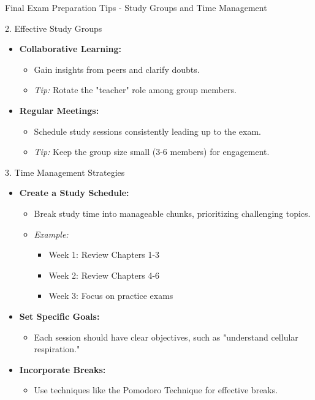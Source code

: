 \documentclass[aspectratio=169]{beamer}
\begin{document}
\begin{frame}[fragile]{Final Exam Preparation Tips - Study Groups and Time Management}
    \begin{block}{2. Effective Study Groups}
        \begin{itemize}
            \item \textbf{Collaborative Learning:}
            \begin{itemize}
                \item Gain insights from peers and clarify doubts.
                \item \textit{Tip:} Rotate the "teacher" role among group members.
            \end{itemize}
            \item \textbf{Regular Meetings:}
            \begin{itemize}
                \item Schedule study sessions consistently leading up to the exam.
                \item \textit{Tip:} Keep the group size small (3-6 members) for engagement.
            \end{itemize}
        \end{itemize}
    \end{block}

    \begin{block}{3. Time Management Strategies}
        \begin{itemize}
            \item \textbf{Create a Study Schedule:}
            \begin{itemize}
                \item Break study time into manageable chunks, prioritizing challenging topics.
                \item \textit{Example:} 
                \begin{itemize}
                    \item Week 1: Review Chapters 1-3
                    \item Week 2: Review Chapters 4-6
                    \item Week 3: Focus on practice exams
                \end{itemize}
            \end{itemize}
            \item \textbf{Set Specific Goals:}
            \begin{itemize}
                \item Each session should have clear objectives, such as "understand cellular respiration."
            \end{itemize}
            \item \textbf{Incorporate Breaks:}
            \begin{itemize}
                \item Use techniques like the Pomodoro Technique for effective breaks.
            \end{itemize}
        \end{itemize}
    \end{block}
\end{frame}
\end{document}
